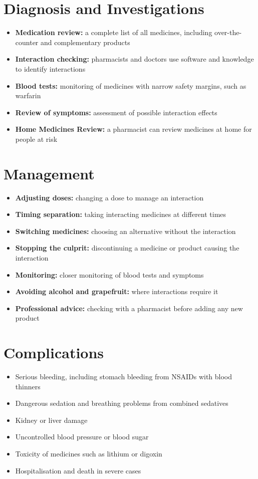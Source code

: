 \section*{Diagnosis and Investigations}
\begin{itemize}
    \item \textbf{Medication review:} a complete list of all medicines, including over-the-counter and complementary products
    \item \textbf{Interaction checking:} pharmacists and doctors use software and knowledge to identify interactions
    \item \textbf{Blood tests:} monitoring of medicines with narrow safety margins, such as warfarin
    \item \textbf{Review of symptoms:} assessment of possible interaction effects
    \item \textbf{Home Medicines Review:} a pharmacist can review medicines at home for people at risk
\end{itemize}

\section*{Management}
\begin{itemize}
    \item \textbf{Adjusting doses:} changing a dose to manage an interaction
    \item \textbf{Timing separation:} taking interacting medicines at different times
    \item \textbf{Switching medicines:} choosing an alternative without the interaction
    \item \textbf{Stopping the culprit:} discontinuing a medicine or product causing the interaction
    \item \textbf{Monitoring:} closer monitoring of blood tests and symptoms
    \item \textbf{Avoiding alcohol and grapefruit:} where interactions require it
    \item \textbf{Professional advice:} checking with a pharmacist before adding any new product
\end{itemize}

\section*{Complications}
\begin{itemize}
    \item Serious bleeding, including stomach bleeding from NSAIDs with blood thinners
    \item Dangerous sedation and breathing problems from combined sedatives
    \item Kidney or liver damage
    \item Uncontrolled blood pressure or blood sugar
    \item Toxicity of medicines such as lithium or digoxin
    \item Hospitalisation and death in severe cases
\end{itemize}

